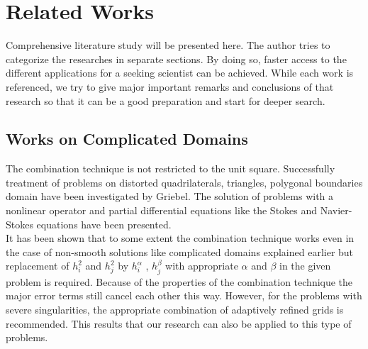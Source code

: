 \chapter{Related Works}
\label{chapter:relatedworks}
Comprehensive literature study will be presented here. The author tries to categorize the researches in separate sections. By doing so, faster access to the different applications for a seeking scientist can be achieved. While each work is referenced, we try to give major important remarks and conclusions of that research so that it can be a good preparation and start for deeper search.
\section{Works on Complicated Domains} 
The combination technique is not restricted to the unit square. Successfully treatment of problems on distorted quadrilaterals, triangles, polygonal boundaries domain have been investigated by Griebel. The solution of problems with a nonlinear operator and partial differential equations like the Stokes and Navier-Stokes equations have been presented. \cite{Griebel1992a, Griebel:1993*3}\\
It has been shown that to some extent the combination technique works even in the case of non-smooth solutions like complicated domains explained earlier but replacement of ${h}^2_i$ and ${h}^2_j$ by ${h}^\alpha_i$ , ${h}^\beta_j$ with appropriate $\alpha$ and $\beta$ in the given problem is required. Because of the properties of the combination technique the major error terms still cancel each other this way. However, for the problems with severe singularities, the appropriate combination of adaptively refined grids is recommended\cite{Griebel1992a}. This results that our research can also be applied to this type of problems.
